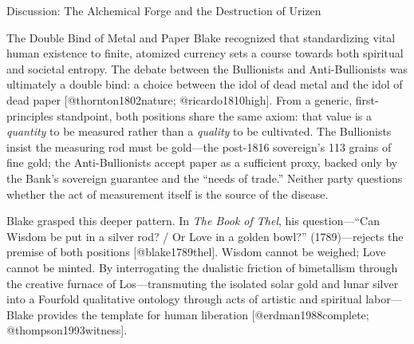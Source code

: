 \documentclass[
  ignorenonframetext,
]{beamer}
\begin{document}
\begin{frame}{Discussion: The Alchemical Forge and the Destruction of
Urizen}
\begin{block}{The Double Bind of Metal and Paper}
\protect{}\label{the-double-bind-of-metal-and-paper}
Blake recognized that standardizing vital human existence to finite,
atomized currency sets a course towards both spiritual and societal
entropy. The debate between the Bullionists and Anti-Bullionists was
ultimately a double bind: a choice between the idol of dead metal and
the idol of dead paper {[}@thornton1802nature; @ricardo1810high{]}. From
a generic, first-principles standpoint, both positions share the same
axiom: that value is a \emph{quantity} to be measured rather than a
\emph{quality} to be cultivated. The Bullionists insist the measuring
rod must be gold---the post-1816 sovereign's 113 grains of fine gold;
the Anti-Bullionists accept paper as a sufficient proxy, backed only by
the Bank's sovereign guarantee and the ``needs of trade.'' Neither party
questions whether the act of measurement itself is the source of the
disease.

Blake grasped this deeper pattern. In \emph{The Book of Thel}, his
question---``Can Wisdom be put in a silver rod? / Or Love in a golden
bowl?'' (1789)---rejects the premise of both positions
{[}@blake1789thel{]}. Wisdom cannot be weighed; Love cannot be minted.
By interrogating the dualistic friction of bimetallism through the
creative furnace of Los---transmuting the isolated solar gold and lunar
silver into a Fourfold qualitative ontology through acts of artistic and
spiritual labor---Blake provides the template for human liberation
{[}@erdman1988complete; @thompson1993witness{]}.
\end{block}


\end{frame}
\end{document}
